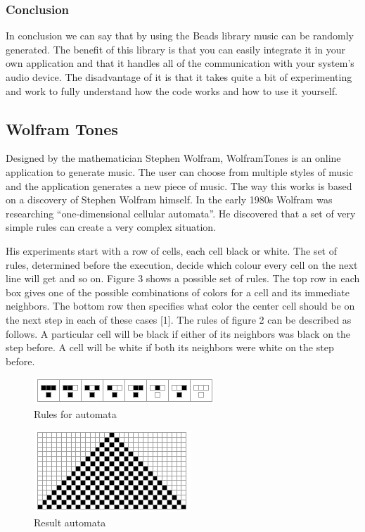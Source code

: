 \documentclass[12pt]{article}
\begin{document}
\subsubsection{Conclusion}

In conclusion we can say that by using the Beads library music can be randomly generated. The benefit of this library is that you can easily integrate it in your own application and that it handles all of the communication with your system's audio device. The disadvantage of it is that it takes quite a bit of experimenting and work to fully understand how the code works and how to use it yourself.

\subsection{Wolfram Tones}

Designed by the mathematician Stephen Wolfram, WolframTones is an online application to generate music. The user can choose from multiple styles of music and the application generates a new piece of music. The way this works is based on a discovery of Stephen Wolfram himself. In the early 1980s Wolfram was researching ``one-dimensional cellular automata''. He discovered that a set of very simple rules can create a very complex situation. 
\newline

His experiments start with a row of cells, each cell black or white. The set of rules, determined before the execution, decide which colour every cell on the next line will get and so on. Figure 3 shows a possible set of rules. The top row in each box gives one of the possible combinations of colors for a cell and its immediate neighbors. The bottom row then specifies what color the center cell should be on the next step in each of these cases [1]. The rules of figure 2 can be described as follows. A particular cell will be black if either of its neighbors was black on the step before. A cell will be white if both its neighbors were white on the step before.

\begin{figure}[h]
\centering
\includegraphics[]{img/wolframRules}
\caption{Rules for automata}
\end{figure}

\begin{figure}[h]
\centering
\includegraphics[]{img/wolframResult-15}
\caption{Result automata}
\end{figure}
\end{document}
